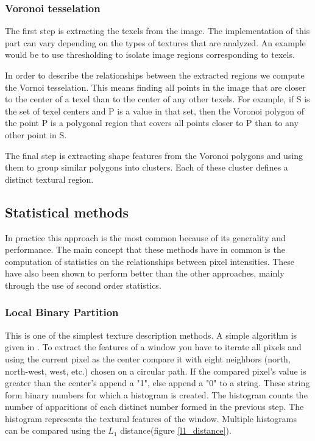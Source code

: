 \documentclass[12pt]{report}
\begin{document}
	\subsubsection{Voronoi tesselation}
	The first step is extracting the texels from the image. The implementation of this part can vary depending on the types of textures that are analyzed. An example would be to use thresholding to isolate image regions corresponding to texels\cite{computer_vision_book}.
	
	In order to describe the relationships between the extracted regions we compute the Vornoi tesselation. This means finding all points in the image that are closer to the center of a texel than to the center of any other texels. For example, if S is the set of texel centers and P is a value in that set, then the Voronoi polygon of the point P is a polygonal region that covers all points closer to P than to any other point in S\cite{computer_vision_book}.
	
	The final step is extracting shape features from the Voronoi polygons and using them to group similar polygons into clusters. Each of these cluster defines a distinct textural region\cite{computer_vision_book}.
	
	\subsection{Statistical methods}
	In practice this approach is the most common because of its generality and performance. The main concept that these methods have in common is the computation of statistics on the relationships between pixel intensities. These have also been shown to perform better than the other approaches, mainly through the use of second order statistics\cite{texture_analysis_review}.
	
	\subsubsection{Local Binary Partition}
	This is one of the simplest texture description methods. A simple algorithm is given in \cite{computer_vision_book}. To extract the features of a window you have to iterate all pixels and using the current pixel as the center compare it with eight neighbors (north, north-west, west, etc.) chosen on a circular path. If the compared pixel's value is greater than the center's append a "1", else append a "0" to a string. These string form binary numbers for which a histogram is created. The histogram counts the number of apparitions of each distinct number formed in the previous step. The histogram represents the textural features of the window. Multiple histograms can be compared using the $ L_1 $ distance(figure \ref{l1_distance}).
	
\end{document}
